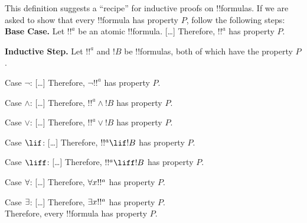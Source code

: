 \documentclass[../../include/open-logic-section]{subfiles}
\begin{document}
\begin{explain}
This definition suggests a ``recipe'' for inductive proofs on
!!{formula}s. If we are asked to show that every !!{formula} has
property $P$, follow the following steps:\\

\textbf{Base Case.} Let $!!^a$ be an atomic !!{formula}. [\ldots]
Therefore, $!!^a$ has property $P$.

\textbf{Inductive Step.} Let $!!^a$ and $!B$ be !!{formula}s, both of
which have the property $P$.

Case $\lnot$: [\ldots] Therefore, $\lnot !!^a$ has property $P$.

Case $\land$: [\ldots] Therefore, $!!^a \land !B$ has property $P$. 

Case $\lor$: [\ldots] Therefore, $!!^a \lor !B$ has property $P$. 

Case $\lif$: [\ldots] Therefore, $!!^a \lif !B$ has property $P$.

Case $\liff$: [\ldots] Therefore, $!!^a \liff !B$ has property $P$.

Case $\lforall[]$: [\ldots] Therefore, $\lforall[x] !!^a$ has property $P$.

Case $\lexists[]$: [\ldots] Therefore, $\lexists[x] !!^a$ has property $P$. \\

Therefore, every !!{formula} has property $P$.
\end{explain}
\end{document}
